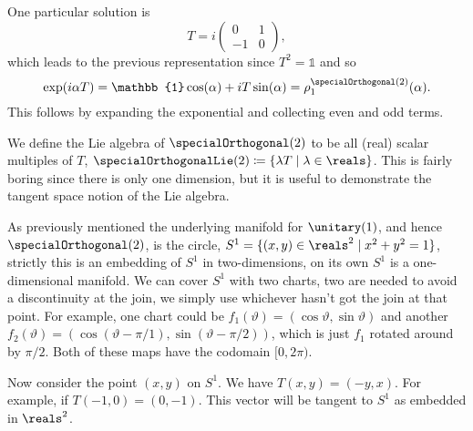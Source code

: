 \documentclass[fleqn]{NotesClass}
\newcommand*{\ident}{\mathbb{1}}
\begin{document}
    One particular solution is
    \begin{equation}
        T = i
        \begin{pmatrix}
            0 & 1\\
            -1 & 0
        \end{pmatrix}
        ,
    \end{equation}
    which leads to the previous representation since \(T^2 = \ident\) and so
    \begin{equation}
        \exp(i\alpha T) = \ident \cos(\alpha) + iT\sin(\alpha) = \rho_1^{\specialOrthogonal(2)}(\alpha).
    \end{equation}
    This follows by expanding the exponential and collecting even and odd terms.
    
    We define the Lie algebra of \(\specialOrthogonal(2)\) to be all (real) scalar multiples of \(T\), \(\specialOrthogonalLie(2) \coloneqq \{\lambda T \mid \lambda \in \reals\}\).
    This is fairly boring since there is only one dimension, but it is useful to demonstrate the tangent space notion of the Lie algebra.
    
    As previously mentioned the underlying manifold for \(\unitary(1)\), and hence \(\specialOrthogonal(2)\), is the circle, \(S^1 = \{(x, y) \in \reals^2 \mid x^2 + y^2 = 1\}\), strictly this is an embedding of \(S^1\) in two-dimensions, on its own \(S^1\) is a one-dimensional manifold.
    We can cover \(S^1\) with two charts, two are needed to avoid a discontinuity at the join, we simply use whichever hasn't got the join at that point.
    For example, one chart could be \(f_1(\vartheta) = (\cos\vartheta, \sin\vartheta)\) and another \(f_2(\vartheta) = (\cos(\vartheta - \pi/1), \sin(\vartheta - \pi/2))\), which is just \(f_1\) rotated around by \(\pi/2\).
    Both of these maps have the codomain \([0, 2\pi)\).
    
    Now consider the point \((x, y)\) on \(S^1\).
    We have \(T(x, y) = (-y, x)\).
    For example, if \(T(-1, 0) = (0, -1)\).
    This vector will be tangent to \(S^1\) as embedded in \(\reals^2\).
    
\end{document}
